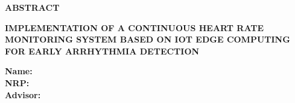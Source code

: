 \clearpage
\thispagestyle{plain}
{}

{\centering\fontsize{12}{14}\selectfont\bfseries ABSTRACT\par}

\vspace{0.2cm}

{\noindent\raggedright
\textbf{IMPLEMENTATION OF A CONTINUOUS HEART RATE MONITORING SYSTEM BASED ON IOT EDGE COMPUTING FOR EARLY ARRHYTHMIA DETECTION}\par}

\vspace{0.2cm}

\noindent
\textbf{Name\hspace{1.55cm}: \NamaMahasiswa}\\
\textbf{NRP\hspace{1.75cm}: \NRP}\\
\textbf{Advisor\hspace{1.2cm}: \PembimbingSatu}\\
\textbf{\PembimbingDua}

\vspace{0.2cm}

